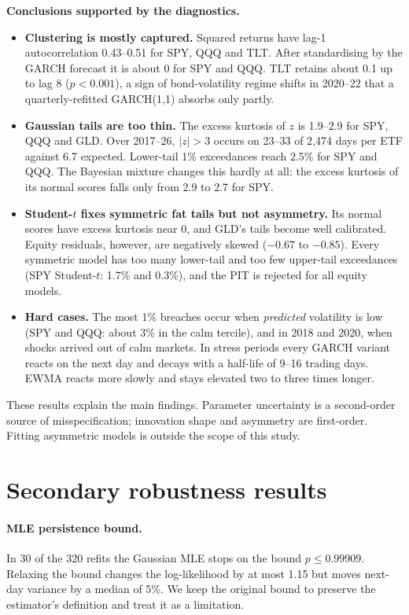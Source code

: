 \documentclass[11pt]{article}
\begin{document}
\noindent\textbf{Conclusions supported by the diagnostics.}
\begin{itemize}
\item \textbf{Clustering is mostly captured.} Squared returns have lag-1 autocorrelation 0.43--0.51 for SPY, QQQ and TLT.
After standardising by the GARCH forecast it is about 0 for SPY and QQQ. TLT retains about 0.1 up to lag 8
($p<0.001$), a sign of bond-volatility regime shifts in 2020--22 that a quarterly-refitted GARCH(1,1) absorbs only partly.
\item \textbf{Gaussian tails are too thin.} The excess kurtosis of $z$ is 1.9--2.9 for SPY, QQQ and GLD. Over 2017--26, $|z|>3$
occurs on 23--33 of 2{,}474 days per ETF against 6.7 expected. Lower-tail 1\% exceedances reach 2.5\% for SPY
and QQQ. The Bayesian mixture changes this hardly at all: the excess kurtosis of its normal scores falls only from 2.9 to 2.7 for SPY.
\item \textbf{Student-$t$ fixes symmetric fat tails but not asymmetry.} Its normal scores have excess kurtosis near 0,
and GLD's tails become well calibrated. Equity residuals, however, are negatively skewed ($-0.67$ to $-0.85$).
Every symmetric model has too many lower-tail and too few upper-tail exceedances (SPY Student-$t$: 1.7\% and
0.3\%), and the PIT is rejected for all equity models.
\item \textbf{Hard cases.} The most 1\% breaches occur when \emph{predicted} volatility is low (SPY and QQQ: about 3\%
in the calm tercile), and in 2018 and 2020, when shocks arrived out of calm markets. In stress periods every
GARCH variant reacts on the next day and decays with a half-life of 9--16 trading days. EWMA reacts more slowly
and stays elevated two to three times longer.
\end{itemize}
These results explain the main findings. Parameter uncertainty is a second-order source of misspecification;
innovation shape and asymmetry are first-order. Fitting asymmetric models is outside the scope of this study.

\section{Secondary robustness results}\label{app:robust}
\paragraph{MLE persistence bound.} In 30 of the 320 refits the Gaussian MLE stops on the bound $p\le0.99909$.
Relaxing the bound changes the log-likelihood by at most 1.15 but moves next-day variance by a median of 5\%. We keep
the original bound to preserve the estimator's definition and treat it as a limitation.
\end{document}

